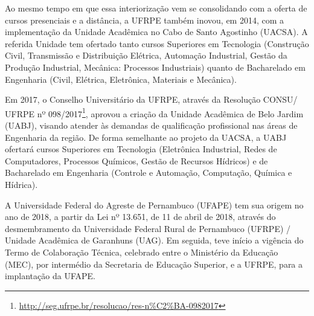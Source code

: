 Ao mesmo tempo em que essa interiorização vem se consolidando com a oferta de cursos presenciais e a distância, a UFRPE também inovou, em 2014, com a implementação da Unidade Acadêmica no Cabo de Santo Agostinho (UACSA). A referida Unidade tem ofertado tanto cursos Superiores em Tecnologia (Construção Civil, Transmissão e Distribuição Elétrica, Automação Industrial, Gestão da Produção Industrial, Mecânica: Processos Industriais) quanto de Bacharelado em Engenharia (Civil, Elétrica, Eletrônica, Materiais e Mecânica).

Em 2017, o Conselho Universitário da UFRPE, através da Resolução CONSU/ UFRPE nº 098/2017\footnote{\url{http://seg.ufrpe.br/resolucao/res-n\%C2\%BA-0982017}}, aprovou a criação da Unidade Acadêmica de Belo Jardim (UABJ), visando atender às demandas de qualificação profissional nas áreas de Engenharia da região. De forma semelhante ao projeto da UACSA, a UABJ ofertará cursos Superiores em Tecnologia (Eletrônica Industrial, Redes de Computadores, Processos Químicos, Gestão de Recursos Hídricos) e de Bacharelado em Engenharia (Controle e Automação, Computação, Química e Hídrica).

A Universidade Federal do Agreste de Pernambuco (UFAPE) tem sua origem no ano de 2018, a partir da Lei nº 13.651, de 11 de abril de 2018, através do desmembramento da Universidade Federal Rural de Pernambuco (UFRPE) / Unidade Acadêmica de Garanhuns (UAG). Em seguida, teve início a vigência do Termo de Colaboração Técnica, celebrado entre o Ministério da Educação (MEC), por intermédio da Secretaria de Educação Superior, e a UFRPE, para a implantação da UFAPE.


